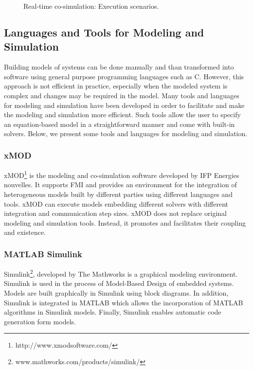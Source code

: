 \begin{figure}[phbt]
\centering

\caption{Real-time co-simulation: Execution scenarios.}
\label{fig:rtcosim}
\end{figure} 

\subsection{Languages and Tools for Modeling and Simulation}

Building models of systems can be done manually and than transformed into software using general purpose programming languages such as C. However, this approach is not efficient in practice, especially when the modeled system is complex and changes may be required in the model. Many tools and languages for modeling and simulation have been developed in order to facilitate and make the modeling and simulation more efficient. Such tools allow the user to specify an equation-based model in a straightforward manner and come with built-in solvers. Below, we present some tools and languages for modeling and simulation.

\subsubsection{xMOD}
xMOD\footnote{http://www.xmodsoftware.com/} is the modeling and co-simulation software developed by IFP Energies nouvelles. It supports FMI and provides an environment for the integration of heterogeneous models built by different parties using different languages and tools. xMOD can execute models embedding different solvers with different integration and communication step sizes. xMOD does not replace original modeling and simulation tools. Instead, it promotes and facilitates their coupling and existence.


\subsubsection{MATLAB Simulink}
Simulink\footnote{www.mathworks.com/products/simulink/}, developed by The Mathworks is a graphical modeling environment. Simulink is used in the  process of Model-Based Design of embedded systems. Models are built graphically in Simulink using block diagrams. In addition, Simulink is integrated in MATLAB which allows the incorporation of MATLAB algorithms in Simulink models. Finally, Simulink enables automatic code generation form models.

